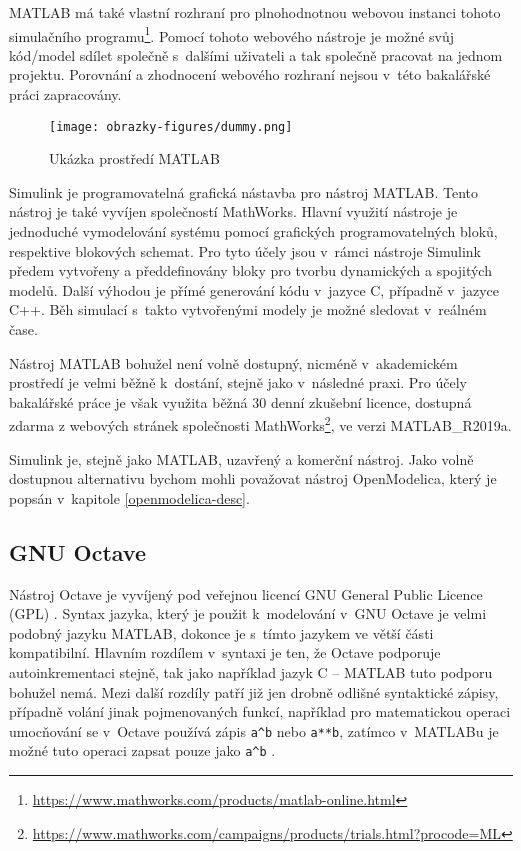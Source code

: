 MATLAB má také vlastní rozhraní pro plnohodnotnou webovou instanci tohoto simulačního programu\footnote{\url{https://www.mathworks.com/products/matlab-online.html}}. Pomocí tohoto webového nástroje je možné svůj kód/model sdílet společně s~dalšími uživateli a tak společně pracovat na jednom projektu. Porovnání a zhodnocení webového rozhraní nejsou v~této bakalářské práci zapracovány.

\begin{figure}
    \centering
    \texttt{[image: obrazky-figures/dummy.png]}
    \caption{Ukázka prostředí MATLAB}
    \label{fig:matlab}
\end{figure}

Simulink je programovatelná grafická nástavba pro nástroj MATLAB. Tento nástroj je také vyvíjen společností MathWorks. Hlavní využití nástroje je jednoduché vymodelování systému pomocí grafických programovatelných bloků, respektive blokových schemat. Pro tyto účely jsou v~rámci nástroje Simulink předem vytvořeny a předdefinovány bloky pro tvorbu dynamických a spojitých modelů. Další výhodou je přímé generování kódu v~jazyce C, případně v~jazyce C++. Běh simulací s~takto vytvořenými modely je možné sledovat v~reálném čase.

Nástroj MATLAB bohužel není volně dostupný, nicméně v~akademickém prostředí je velmi běžně k~dostání, stejně jako v~následné praxi. Pro účely bakalářské práce je však využita běžná 30 denní zkušební licence, dostupná zdarma z webových stránek společnosti MathWorks\footnote{\url{https://www.mathworks.com/campaigns/products/trials.html?procode=ML}}, ve verzi MATLAB\_R2019a.

Simulink je, stejně jako MATLAB, uzavřený a komerční nástroj. Jako volně dostupnou alternativu bychom mohli považovat nástroj OpenModelica, který je popsán v~kapitole \ref{openmodelica-desc}.

\subsection{GNU Octave}
\label{octave-desc}
Nástroj Octave je vyvíjený pod veřejnou licencí GNU General Public Licence (GPL) \cite{OctaveManual}. Syntax jazyka, který je použit k~modelování v~GNU Octave je velmi podobný jazyku MATLAB, dokonce je s~tímto jazykem ve větší části kompatibilní. Hlavním rozdílem v~syntaxi je ten, že Octave podporuje autoinkrementaci stejně, tak jako například jazyk C -- MATLAB tuto podporu bohužel nemá.
Mezi další rozdíly patří již jen drobně odlišné syntaktické zápisy, případně volání jinak pojmenovaných funkcí, například pro matematickou operaci umocňování se v~Octave používá zápis \texttt{a\^\space b} nebo \texttt{a**b}, zatímco v~MATLABu je možné tuto operaci zapsat pouze jako \texttt{a\^\space b} \cite{OctaveManual}.

